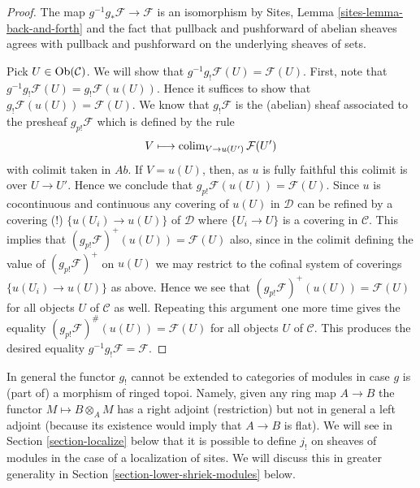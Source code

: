 \begin{proof}
The map $g^{-1}g_*\mathcal{F} \to \mathcal{F}$ is an isomorphism
by Sites, Lemma \ref{sites-lemma-back-and-forth} and the fact that
pullback and pushforward of abelian sheaves agrees with
pullback and pushforward on the underlying sheaves of sets.

\medskip\noindent
Pick $U \in \mathop{\mathrm{Ob}}\nolimits(\mathcal{C})$. We will show that
$g^{-1}g_!\mathcal{F}(U) = \mathcal{F}(U)$. First, note that
$g^{-1}g_!\mathcal{F}(U) = g_!\mathcal{F}(u(U))$. Hence it suffices
to show that $g_!\mathcal{F}(u(U)) = \mathcal{F}(U)$.
We know that $g_!\mathcal{F}$ is the (abelian) sheaf associated
to the presheaf $g_{p!}\mathcal{F}$ which is defined by the rule
$$
V \longmapsto \mathop{\mathrm{colim}}\nolimits_{V \to u(U')} \mathcal{F}(U')
$$
with colimit taken in $\textit{Ab}$. If $V = u(U)$, then, as $u$ is
fully faithful this colimit is over $U \to U'$. Hence we conclude
that $g_{p!}\mathcal{F}(u(U)) = \mathcal{F}(U)$.
Since $u$ is cocontinuous and continuous any covering of $u(U)$ in
$\mathcal{D}$ can be refined by a covering (!) $\{u(U_i) \to u(U)\}$
of $\mathcal{D}$ where $\{U_i \to U\}$ is a covering in $\mathcal{C}$.
This implies that $(g_{p!}\mathcal{F})^+(u(U)) = \mathcal{F}(U)$ also,
since in the colimit defining the value of $(g_{p!}\mathcal{F})^+$
on $u(U)$ we may restrict to the cofinal system of coverings
$\{u(U_i) \to u(U)\}$ as above. Hence we see that
$(g_{p!}\mathcal{F})^+(u(U)) = \mathcal{F}(U)$ for all objects $U$
of $\mathcal{C}$ as well. Repeating this argument one more time
gives the equality $(g_{p!}\mathcal{F})^\#(u(U)) = \mathcal{F}(U)$
for all objects $U$ of $\mathcal{C}$. This produces the desired
equality $g^{-1}g_!\mathcal{F} = \mathcal{F}$.
\end{proof}

\begin{remark}
\label{remark-no-extension}
In general the functor $g_!$ cannot be extended to categories of modules
in case $g$ is (part of) a morphism of ringed topoi. Namely, given any
ring map $A \to B$ the functor $M \mapsto B \otimes_A M$ has a right adjoint
(restriction) but not in general a left adjoint (because its existence
would imply that $A \to B$ is flat). We will see in
Section \ref{section-localize}
below that it is possible to define $j_!$ on sheaves of modules
in the case of a localization of sites.
We will discuss this in greater generality in
Section \ref{section-lower-shriek-modules} below.
\end{remark}

